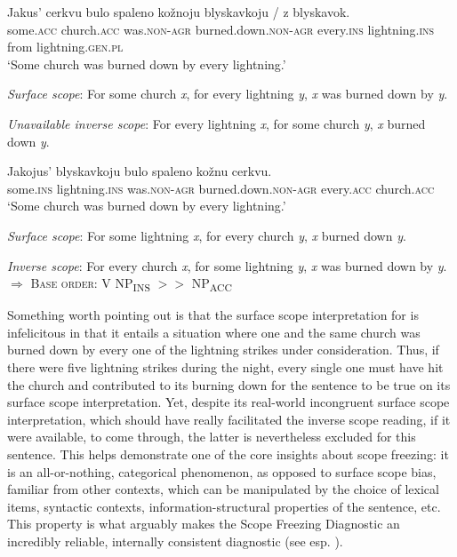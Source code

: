 \documentclass[output=paper,colorlinks,citecolor=brown]{langscibook}
\begin{document}
\ea%
    \label{ex:antonyuk:24}

\ea \label{ex:antonyuk:24a}
\gll   Jakus’ cerkvu     bulo spaleno     kožnoju blyskavkoju / z blyskavok.\\
  some.\textsc{acc} church.\textsc{acc}   was.\textsc{non-agr} burned.down.\textsc{non-agr}  every.\textsc{ins} lightning.\textsc{ins} {} from lightning.\textsc{gen.pl}\\
\glt ‘Some church was burned down by every lightning.’

  \textit{Surface scope}: For some church \textit{x}, for every lightning \textit{y}, \textit{x} was burned down by \textit{y}.

  \textit{Unavailable inverse scope}: For every lightning \textit{x}, for some church \textit{y}, \textit{x} burned down \textit{y}.

\ex
\gll   Jakojus' blyskavkoju     bulo spaleno     kožnu cerkvu.\\
  some.\textsc{ins} lightning.\textsc{ins}    was.\textsc{non-agr} burned.down.\textsc{non-agr}   every.\textsc{acc} church.\textsc{acc}\\
\glt `Some church was burned down by every lightning.’

  \textit{Surface scope}: For some lightning \textit{x}, for every church \textit{y}, \textit{x} burned down \textit{y}.

  \textit{Inverse scope}: For every church \textit{x}, for some lightning \textit{y}, \textit{x} was burned down by \textit{y}.
 \z
 $\Rightarrow$ \textsc{Base order}: V NP\textsubscript{INS} $>>$ NP\textsubscript{ACC}
\z

\noindent Something worth pointing out is that the surface scope interpretation for  is infelicitous in that it entails a situation where one and the same church was burned down by every one of the lightning strikes under consideration. Thus, if there were five lightning strikes during the night, every single one must have hit the church and contributed to its burning down for the sentence to be true on its surface scope interpretation. Yet, despite its real-world incongruent surface scope interpretation, which should have really facilitated the inverse scope reading, if it were available, to come through, the latter is nevertheless excluded for this sentence. This helps demonstrate one of the core insights about scope freezing: it is an all-or-nothing, categorical phenomenon, as opposed to surface scope bias, familiar from other contexts, which can be manipulated by the choice of lexical items, syntactic contexts, information-structural properties of the sentence, etc. This property is what arguably makes the Scope Freezing Diagnostic an incredibly reliable, internally consistent diagnostic (see esp. \citealt{Antonyuk2023}).
\end{document}
